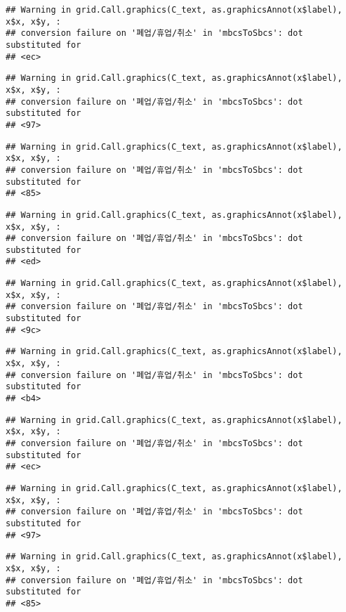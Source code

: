 \documentclass[
]{book}
\begin{document}
\begin{verbatim}
## Warning in grid.Call.graphics(C_text, as.graphicsAnnot(x$label), x$x, x$y, :
## conversion failure on '폐업/휴업/취소' in 'mbcsToSbcs': dot substituted for
## <ec>
\end{verbatim}

\begin{verbatim}
## Warning in grid.Call.graphics(C_text, as.graphicsAnnot(x$label), x$x, x$y, :
## conversion failure on '폐업/휴업/취소' in 'mbcsToSbcs': dot substituted for
## <97>
\end{verbatim}

\begin{verbatim}
## Warning in grid.Call.graphics(C_text, as.graphicsAnnot(x$label), x$x, x$y, :
## conversion failure on '폐업/휴업/취소' in 'mbcsToSbcs': dot substituted for
## <85>
\end{verbatim}

\begin{verbatim}
## Warning in grid.Call.graphics(C_text, as.graphicsAnnot(x$label), x$x, x$y, :
## conversion failure on '폐업/휴업/취소' in 'mbcsToSbcs': dot substituted for
## <ed>
\end{verbatim}

\begin{verbatim}
## Warning in grid.Call.graphics(C_text, as.graphicsAnnot(x$label), x$x, x$y, :
## conversion failure on '폐업/휴업/취소' in 'mbcsToSbcs': dot substituted for
## <9c>
\end{verbatim}

\begin{verbatim}
## Warning in grid.Call.graphics(C_text, as.graphicsAnnot(x$label), x$x, x$y, :
## conversion failure on '폐업/휴업/취소' in 'mbcsToSbcs': dot substituted for
## <b4>
\end{verbatim}

\begin{verbatim}
## Warning in grid.Call.graphics(C_text, as.graphicsAnnot(x$label), x$x, x$y, :
## conversion failure on '폐업/휴업/취소' in 'mbcsToSbcs': dot substituted for
## <ec>
\end{verbatim}

\begin{verbatim}
## Warning in grid.Call.graphics(C_text, as.graphicsAnnot(x$label), x$x, x$y, :
## conversion failure on '폐업/휴업/취소' in 'mbcsToSbcs': dot substituted for
## <97>
\end{verbatim}

\begin{verbatim}
## Warning in grid.Call.graphics(C_text, as.graphicsAnnot(x$label), x$x, x$y, :
## conversion failure on '폐업/휴업/취소' in 'mbcsToSbcs': dot substituted for
## <85>
\end{verbatim}
\end{document}
